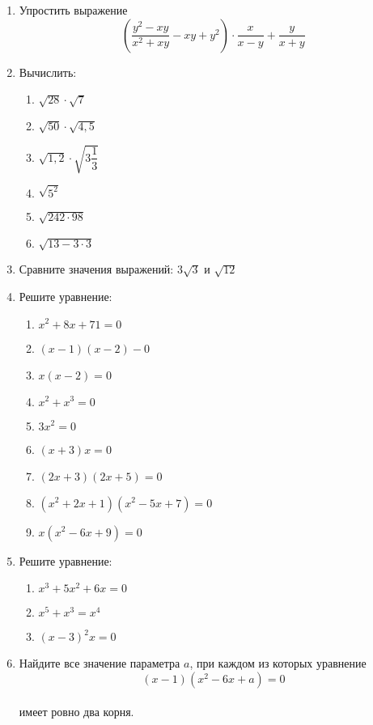 \documentclass[12pt, a4paper]{article}
\begin{document}
		

\begin{enumerate}
	\item Упростить выражение $$\left(\dfrac{y^2-xy}{x^2+xy}-xy+y^2\right)\cdot\dfrac{x}{x-y}+\dfrac{y}{x+y}$$
	\item Вычислить:
	\begin{multicols}{2}
		\begin{enumerate}[label=\asbuk*)]
			\item $\sqrt{28}\cdot\sqrt{7}$
			\item $\sqrt{50}\cdot\sqrt{4,5}$
			\item $\sqrt{1,2}\cdot\sqrt{3\dfrac{1}{3}}$
			\item $\sqrt{5^2}$
			\item $\sqrt{242 \cdot 98}$
			\item $\sqrt{13 - 3 \cdot 3}$
		\end{enumerate}
	\end{multicols}
	\item Сравните значения выражений: $3\sqrt{3}$ и $\sqrt{12}$
	\item Решите уравнение:
	\begin{multicols}{2}
		\begin{enumerate}[label=\asbuk*)]
			\item $x^2+8x+71=0$
			\item $(x-1)(x-2)-0$
			\item $x(x-2)=0$
			\item $x^2+x^3=0$
			\item $3x^2=0$
			\item $(x+3)x=0$
			\item $(2x+3)(2x+5)=0$
			\item $(x^2+2x+1)(x^2-5x+7)=0$
			\item $x(x^2-6x+9)=0$
		\end{enumerate}
	\end{multicols}
	\item Решите уравнение:
	\begin{multicols}{2}
	\begin{enumerate}[label=\asbuk*)]
		\item $x^3+5x^2+6x=0$
		\item $x^5+x^3=x^4$
		\item $(x-3)^2x=0$
	\end{enumerate}
	\end{multicols}
	\item Найдите все значение параметра $a$, при каждом из которых уравнение $$(x-1)(x^2-6x+a)=0$$ \\ имеет ровно два корня.

\end{enumerate}
\end{document}
